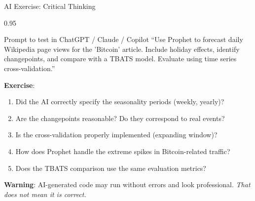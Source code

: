\documentclass[9pt, aspectratio=169, t]{beamer}
\begin{document}
\begin{frame}{AI Exercise: Critical Thinking}
    \begin{cminipage}{0.95\textwidth}
    \vspace{-0.3cm}
    \begin{block}{\footnotesize Prompt to test in ChatGPT / Claude / Copilot}
        {\footnotesize
        ``Use Prophet to forecast daily Wikipedia page views for the 'Bitcoin' article. Include holiday effects, identify changepoints, and compare with a TBATS model. Evaluate using time series cross-validation.''
        }
    \end{block}
    \vspace{-2mm}
    {\footnotesize
    \textbf{Exercise}:
    \begin{enumerate}\setlength{\itemsep}{0pt}
        \item Did the AI correctly specify the seasonality periods (weekly, yearly)?
        \item Are the changepoints reasonable? Do they correspond to real events?
        \item Is the cross-validation properly implemented (expanding window)?
        \item How does Prophet handle the extreme spikes in Bitcoin-related traffic?
        \item Does the TBATS comparison use the same evaluation metrics?
    \end{enumerate}
    }
    \vspace{-2mm}
    \begin{alertblock}{}
        {\footnotesize \textbf{Warning}: AI-generated code may run without errors and look professional. \textit{That does not mean it is correct.}}
    \end{alertblock}
    \end{cminipage}
\end{frame}

\end{document}
